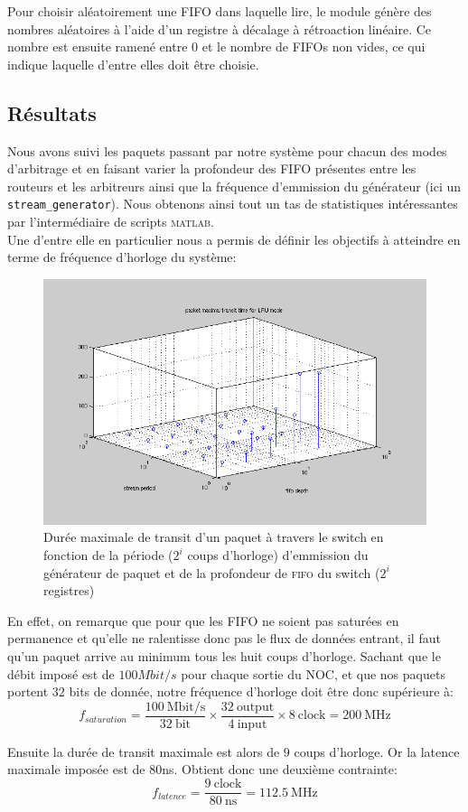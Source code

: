 Pour choisir aléatoirement une FIFO dans laquelle lire, le module génère des
nombres aléatoires à l'aide d'un registre à décalage à rétroaction linéaire. Ce
nombre est ensuite ramené entre 0 et le nombre de FIFOs non vides, ce qui
indique laquelle d'entre elles doit être choisie.


\subsection{Résultats}

Nous avons suivi les paquets passant par notre système pour chacun des modes
d'arbitrage et en faisant varier la profondeur des FIFO présentes entre les
routeurs et les arbitreurs ainsi que la fréquence d'emmission du générateur (ici
un \texttt{stream\_generator}). Nous obtenons ainsi tout un tas de statistiques
intéressantes par l'intermédiaire de scripts \textsc{matlab}. \\
Une d'entre elle en particulier nous a permis de définir les objectifs à
atteindre en terme de fréquence d'horloge du système:

\begin{figure}[!h]
  \centering
  \includegraphics[width=\textwidth]{./data/max_transit_time.png}
  \caption{Durée maximale de transit d'un paquet à travers le switch en
    fonction de la période ($2^i$ coups d'horloge) d'emmission du générateur
    de paquet et de la profondeur de \textsc{fifo} du switch ($2^i$ registres)}
\end{figure}

En effet, on remarque que pour que les FIFO ne soient pas saturées en permanence
et qu'elle ne ralentisse donc pas le flux de données entrant, il faut qu'un
paquet arrive au minimum tous les huit coups d'horloge. Sachant que le débit
imposé est de $100Mbit/s$ pour chaque sortie du NOC, et que nos paquets portent
32 bits de donnée, notre fréquence d'horloge doit être donc supérieure à:
\[
  f_{saturation} = \frac{100\ \mbox{Mbit/s}}{32\ \mbox{bit}}
    \times \frac{32\ \mbox{output}}{4\ \mbox{input}}
    \times 8\ \mbox{clock} =
  200\ \mbox{MHz}
\]

Ensuite la durée de transit maximale est alors de 9 coups d'horloge. Or la
latence maximale imposée est de 80ns. Obtient donc une deuxième contrainte:
\[
  f_{latence} = \frac{9\ \mbox{clock}}{80\ \mbox{ns}} = 112.5\ \mbox{MHz}
\]

